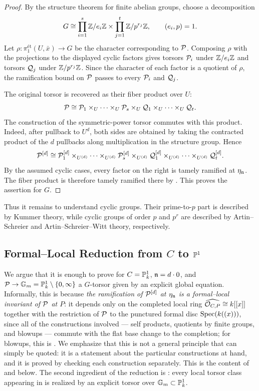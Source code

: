 \begin{proof}
By the structure theorem for finite abelian groups, choose a decomposition
\[
G \cong
\prod_{i=1}^s \mathbb{Z}/e_i\mathbb{Z} \times \prod_{j=1}^t \mathbb{Z}/p^{r_j}\mathbb{Z},
\qquad (e_i,p)=1.
\]
Let $\rho:\pi_1^{\text{\'et}}(U,\bar{x})\to G$ be the character
corresponding to $\mathcal{P}$. Composing $\rho$ with the projections to the displayed
cyclic factors gives torsors $\mathcal{P}_i$ under $\mathbb{Z}/e_i\mathbb{Z}$ and torsors $\mathcal{Q}_j$
under $\mathbb{Z}/p^{r_j}\mathbb{Z}$. Since the character of each factor is a quotient of
$\rho$, the ramification bound on $\mathcal{P}$ passes to every $\mathcal{P}_i$ and $\mathcal{Q}_j$.

The original torsor is recovered as their fiber product over $U$:
\[
\mathcal{P} \cong
\mathcal{P}_1 \times_U \cdots \times_U \mathcal{P}_s
\times_U \mathcal{Q}_1 \times_U \cdots \times_U \mathcal{Q}_t.
\]
The construction of the symmetric-power torsor commutes with this product.
Indeed, after pullback to $U^d$, both sides are obtained by taking the
contracted product of the $d$ pullbacks along multiplication in the structure
group. Hence
\[
\mathcal{P}^{[d]} \cong
\mathcal{P}_1^{[d]} \times_{U^{(d)}} \cdots \times_{U^{(d)}} \mathcal{P}_s^{[d]}
\times_{U^{(d)}} \mathcal{Q}_1^{[d]} \times_{U^{(d)}} \cdots
\times_{U^{(d)}} \mathcal{Q}_t^{[d]}.
\]
By the assumed cyclic cases, every factor on the right is tamely ramified at
$\eta_{\mathfrak{n}}$. The fiber product is therefore tamely ramified there by
. This proves the assertion for
$G$.
\end{proof}

Thus it remains to understand cyclic groups. Their prime-to-$p$ part is
described by Kummer theory, while cyclic groups of order $p$ and $p^r$ are
described by Artin--Schreier and Artin--Schreier--Witt theory, respectively.

\subsection{Formal--Local Reduction from \texorpdfstring{$C$}{C} to \texorpdfstring{$\mathbb{P}^1$}{P1}}

We argue that it is enough to prove  for $C=\mathbb{P}^1_k$, $\mathfrak{n} = d \cdot 0$, and $\mathcal{P} \to \mathbb{G}_m = \mathbb{P}^1_k \setminus \{0, \infty\}$ a $G$-torsor given by an explicit global equation.
Informally, this is because \emph{the ramification of $\mathcal{P}^{[d]}$ at $\eta_{\mathfrak{n}}$ is a formal--local invariant of $\mathcal{P}$ at $P$}:
it depends only on the completed local ring $\widehat{\mathcal{O}_{C,P}} \cong k[[x]]$ together with the restriction of $\mathcal{P}$
to the punctured formal disc $\operatorname{Spec}(k((x)))$, since all of the constructions involved --- self products, quotients by finite
groups, and blowups --- commute with the flat base change to the completion; for blowups, this is
.
We emphasize that this is not a general principle that can simply be quoted: it is a statement about the particular
constructions at hand, and it is proved by checking each construction separately. This is the content of
 and  below.
The second ingredient of the reduction is : every local torsor class appearing in
 is realized by an explicit torsor over $\mathbb{G}_m \subset \mathbb{P}^1_k$.


